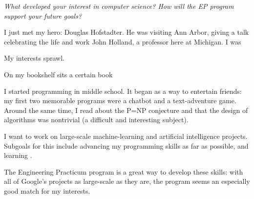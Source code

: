 
\emph{What developed your interest in computer science? How will the EP program support your future goals?}

I just met my hero: Douglas Hofstadter. He was visiting Ann Arbor, giving a talk 
celebrating the life and work John Holland, a professor here at Michigan. I was


My interests sprawl. 

On my bookshelf sits a certain book

I started programming in middle school. It began as a way to entertain friends:
my first two memorable programs were a chatbot and a text-adventure game.
Around the same time, I read about the P=NP conjecture and that
the design of algorithms was nontrivial (a difficult and interesting subject).

I want to work on large-scale machine-learning and artificial intelligence projects.
Subgoals for this include advancing my programming skills as far as possible, and
learning .

The Engineering Practicum program is a great way to develop these skills: with all of Google's projects
as large-scale as they are, the program seems an especially good match for my interests.
